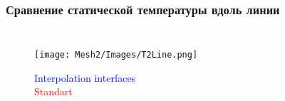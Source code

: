 \documentclass[c, aspectratio = 169]{beamer}
\begin{document}
    
        \begin{frame}
            \frametitle{Сравнение статической температуры вдоль линии}
            \begin{columns}[c]
                
                \vspace{-0.4cm}
                
                    \begin{figure}
                        \texttt{[image: Mesh2/Images/T2Line.png]}
                        \caption{\textcolor{blue}{Interpolation interfaces}\\
                        \textcolor{red}{Standart} }   
                    \end{figure} 
                \end{columns}
            \end{frame}
    
    
    
    
    
    
    
    
    
    
    
    
    
    
    
    
    
    
    
    
    
    
    
    
    
    
    
    
    
    
    
    
    
    
    
    
    
    
    
    
    
    
    
    
    
    
    
    
    
    
    
    
    
    
    
    
    
    
    
    
    
    
    
    
    
\end{document}
